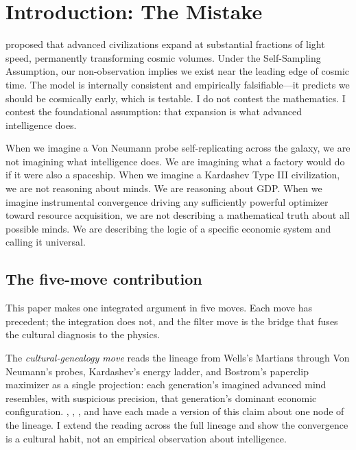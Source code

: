 \documentclass[11pt,twocolumn]{article}
\begin{document}
\section{Introduction: The Mistake}

\citet{Hanson2021} proposed that advanced civilizations expand at substantial
fractions of light speed, permanently transforming cosmic volumes. Under the
Self-Sampling Assumption, our non-observation implies we exist near the
leading edge of cosmic time. The model is internally consistent and
empirically falsifiable—it predicts we should be cosmically early, which is
testable. I do not contest the mathematics. I contest the foundational
assumption: that expansion is what advanced intelligence does.

When we imagine a Von Neumann probe self-replicating across the galaxy, we
are not imagining what intelligence does. We are imagining what a factory
would do if it were also a spaceship. When we imagine a Kardashev Type III
civilization, we are not reasoning about minds. We are reasoning about GDP.
When we imagine instrumental convergence driving any sufficiently powerful
optimizer toward resource acquisition, we are not describing a mathematical
truth about all possible minds. We are describing the logic of a specific
economic system and calling it universal.

\subsection{The five-move contribution}

This paper makes one integrated argument in five moves. Each move has
precedent; the integration does not, and the filter move is the bridge
that fuses the cultural diagnosis to the physics.

The \emph{cultural-genealogy move} reads the lineage from Wells's Martians
through Von Neumann's probes, Kardashev's energy ladder, and Bostrom's
paperclip maximizer as a single projection: each generation's imagined
advanced mind resembles, with suspicious precision, that generation's
dominant economic configuration. \citet{Rieder2008}, \citet{Mirowski2002},
\citet{Cirkovic2015}, and \citet{GebruTorres2024} have each made a version
of this claim about one node of the lineage. I extend the reading across
the full lineage and show the convergence is a cultural habit, not an
empirical observation about intelligence.
\end{document}
